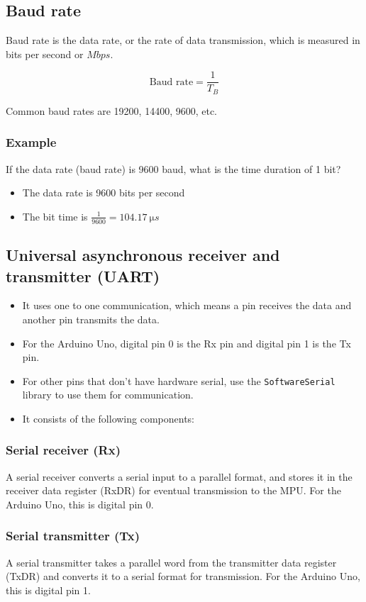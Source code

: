 \documentclass[11pt]{article}
\begin{document}
\subsection{Baud rate}
\label{sec:org8522c51}
Baud rate is the data rate, or the rate of data transmission, which is measured in bits per second or \(\unit{Mbps}\).

\[\text{Baud rate} = \frac{1}{T_B}\]

Common baud rates are 19200, 14400, 9600, etc.
\subsubsection{Example}
\label{sec:orge5c677a}
If the data rate (baud rate) is 9600 baud, what is the time duration of 1 bit?
\begin{itemize}
\item The data rate is 9600 bits per second
\item The bit time is \(\frac{1}{9600} = \qty{104.17}{\micro s}\)
\end{itemize}
\subsection{Universal asynchronous receiver and transmitter (UART)}
\label{sec:org0f5104c}
\begin{itemize}
\item It uses one to one communication, which means a pin receives the data and another pin transmits the data.
\item For the Arduino Uno, digital pin 0 is the Rx pin and digital pin 1 is the Tx pin.
\item For other pins that don't have hardware serial, use the \texttt{SoftwareSerial} library to use them for communication.
\item It consists of the following components:
\end{itemize}
\subsubsection{Serial receiver (Rx)}
\label{sec:org94b1089}
A serial receiver converts a serial input to a parallel format, and stores it in the receiver data register (RxDR) for eventual transmission to the MPU. For the Arduino Uno, this is digital pin 0.
\subsubsection{Serial transmitter (Tx)}
\label{sec:org8028467}
A serial transmitter takes a parallel word from the transmitter data register (TxDR) and converts it to a serial format for transmission. For the Arduino Uno, this is digital pin 1.
\end{document}
